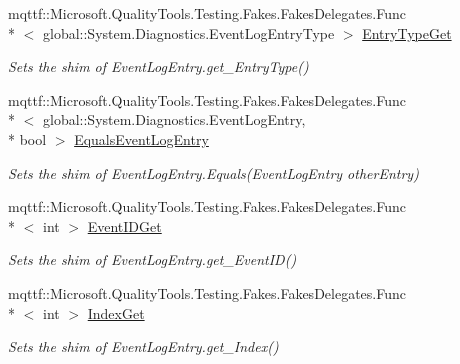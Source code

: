 \begin{DoxyCompactItemize}
mqttf\-::\-Microsoft.\-Quality\-Tools.\-Testing.\-Fakes.\-Fakes\-Delegates.\-Func\\*
$<$ global\-::\-System.\-Diagnostics.\-Event\-Log\-Entry\-Type $>$ \hyperlink{class_system_1_1_diagnostics_1_1_fakes_1_1_shim_event_log_entry_a3ae0dbb44f0e2bb8cd16af06303013c7}{Entry\-Type\-Get}
\begin{DoxyCompactList}\small\item\em Sets the shim of Event\-Log\-Entry.\-get\-\_\-\-Entry\-Type()\end{DoxyCompactList}\item 
mqttf\-::\-Microsoft.\-Quality\-Tools.\-Testing.\-Fakes.\-Fakes\-Delegates.\-Func\\*
$<$ global\-::\-System.\-Diagnostics.\-Event\-Log\-Entry, \\*
bool $>$ \hyperlink{class_system_1_1_diagnostics_1_1_fakes_1_1_shim_event_log_entry_abdf32ccd1d2939da65f79f0a9ab2bf9f}{Equals\-Event\-Log\-Entry}
\begin{DoxyCompactList}\small\item\em Sets the shim of Event\-Log\-Entry.\-Equals(\-Event\-Log\-Entry other\-Entry)\end{DoxyCompactList}\item 
mqttf\-::\-Microsoft.\-Quality\-Tools.\-Testing.\-Fakes.\-Fakes\-Delegates.\-Func\\*
$<$ int $>$ \hyperlink{class_system_1_1_diagnostics_1_1_fakes_1_1_shim_event_log_entry_a06b76ac10bf94472887703c3747a863a}{Event\-I\-D\-Get}
\begin{DoxyCompactList}\small\item\em Sets the shim of Event\-Log\-Entry.\-get\-\_\-\-Event\-I\-D()\end{DoxyCompactList}\item 
mqttf\-::\-Microsoft.\-Quality\-Tools.\-Testing.\-Fakes.\-Fakes\-Delegates.\-Func\\*
$<$ int $>$ \hyperlink{class_system_1_1_diagnostics_1_1_fakes_1_1_shim_event_log_entry_a475d4b697761c694f5d7ebf4d10bd30a}{Index\-Get}
\begin{DoxyCompactList}\small\item\em Sets the shim of Event\-Log\-Entry.\-get\-\_\-\-Index()\end{DoxyCompactList}\item 

\end{DoxyCompactItemize}
